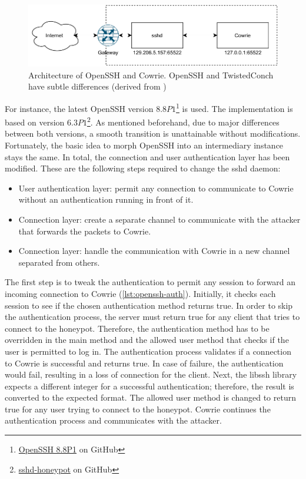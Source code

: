 \begin{figure}[ht]
    \centering
    \includegraphics{figures/sshd-honeypot.pdf}
    \caption[Architecture of OpenSSH and Cowrie]{
        Architecture of OpenSSH and Cowrie.
        OpenSSH and TwistedConch have subtle differences (derived from \cite{vetterl2020})
    }
    \label{fig:cowrie-fix}
\end{figure}

For instance, the latest OpenSSH version $8.8P1$\footnote{\href{https://github.com/openssh/openssh-portable/commit/bf944e3794eff5413f2df1ef37cddf96918c6bde}{OpenSSH 8.8P1} on GitHub} is used.
The implementation is based on \citet{vetterl2020} version $6.3P1$\footnote{\href{https://github.com/amv42/sshd-honeypot/commit/f58830161002baec9d3ed218e78ddb06b0d40a23}{sshd-honeypot} on GitHub}.
As mentioned beforehand, due to major differences between both versions, a smooth transition is unattainable without modifications.
Fortunately, the basic idea to morph OpenSSH into an intermediary instance stays the same.
In total, the connection and user authentication layer has been modified.
These are the following steps required to change the sshd daemon:

\begin{itemize}
    \item User authentication layer: permit any connection to communicate to Cowrie without an authentication running in front of it.
    \item Connection layer: create a separate channel to communicate with the attacker that forwards the packets to Cowrie.
    \item Connection layer: handle the communication with Cowrie in a new channel separated from others.
\end{itemize}

The first step is to tweak the authentication to permit any session to forward an incoming connection to Cowrie (\autoref{lst:openssh-auth}).
Initially, it checks each session to see if the chosen authentication method returns true.
In order to skip the authentication process, the server must return true for any client that tries to connect to the honeypot.
Therefore, the authentication method has to be overridden in the main method and the allowed user method that checks if the user is permitted to log in.
The authentication process validates if a connection to Cowrie is successful and returns true.
In case of failure, the authentication would fail, resulting in a loss of connection for the client.
Next, the libssh library expects a different integer for a successful authentication; therefore, the result is converted to the expected format.
The allowed user method is changed to return true for any user trying to connect to the honeypot.
Cowrie continues the authentication process and communicates with the attacker.

